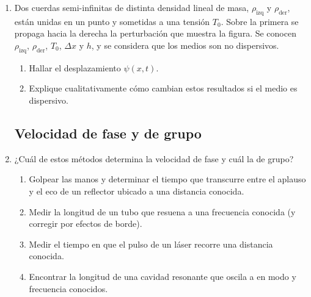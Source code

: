 \documentclass[11pt,spanish,a4paper]{article}
\begin{document}
\begin{enumerate}
\item 
\begin{minipage}[t][2.1cm]{0.6\textwidth}
Dos cuerdas semi-infinitas de distinta densidad lineal de masa, $\rho_\text{izq}$ y $\rho_\text{der}$, están unidas en un punto y sometidas a una tensión $T_0$.
Sobre la primera se propaga hacia la derecha la perturbación que muestra la figura.
Se conocen $\rho_\text{izq}$, $\rho_\text{der}$, $T_0$, $\Delta x$ y $h$, y se considera que los medios son no dispersivos.
\end{minipage}
\begin{minipage}[c][0.4cm][t]{0.34\textwidth}
\end{minipage}
\begin{enumerate}
	\item Hallar el desplazamiento $\psi(x,t)$.
	\item Explique cualitativamente cómo cambian estos resultados si el medio es dispersivo.
\end{enumerate}




\subsection*{Velocidad de fase y de grupo}

\item ¿Cuál de estos métodos determina la velocidad de fase y cuál la de grupo?
\begin{enumerate}
\item Golpear las manos y determinar el tiempo que transcurre entre el aplauso y el eco de un reflector ubicado a una distancia conocida.
\item Medir la longitud de un tubo que resuena a una frecuencia conocida (y corregir por efectos de borde).
\item Medir el tiempo en que el pulso de un láser recorre una distancia conocida.
\item Encontrar la longitud de una cavidad resonante que oscila a en modo y frecuencia conocidos.
\end{enumerate}



\end{enumerate}
\end{document}
